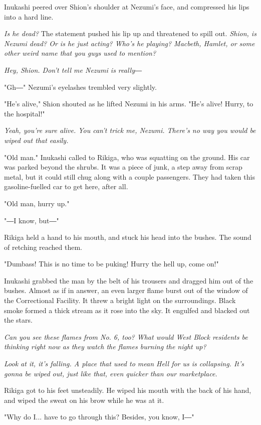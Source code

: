 Inukashi peered over Shion's shoulder at Nezumi's face, and compressed
his lips into a hard line.

\emph{Is he dead?} The statement pushed his lip up and threatened to spill out.
\emph{Shion, is Nezumi dead? Or is he just acting? Who's he playing? Macbeth,
Hamlet, or some other weird name that you guys used to mention?}

\emph{Hey, Shion. Don't tell me Nezumi is really―}

"Gh―" Nezumi's eyelashes trembled very slightly.

"He's alive," Shion shouted as he lifted Nezumi in his arms. "He's
alive! Hurry, to the hospital!"

\emph{Yeah, you're sure alive. You can't trick me, Nezumi. There's no way you
would be wiped out that easily.}

"Old man." Inukashi called to Rikiga, who was squatting on the ground.
His car was parked beyond the shrubs. It was a piece of junk, a step
away from scrap metal, but it could still chug along with a couple
passengers. They had taken this gasoline-fuelled car to get here, after
all.

"Old man, hurry up."

"―I know, but―"

Rikiga held a hand to his mouth, and stuck his head into the bushes. The
sound of retching reached them.

"Dumbass! This is no time to be puking! Hurry the hell up, come on!"

Inukashi grabbed the man by the belt of his trousers and dragged him out
of the bushes. Almost as if in answer, an even larger flame burst out of
the window of the Correctional Facility. It threw a bright light on the
surroundings. Black smoke formed a thick stream as it rose into the sky.
It engulfed and blacked out the stars.

\emph{Can you see these flames from No. 6, too? What would West Block
residents be thinking right now as they watch the flames burning the
night up?}

\emph{Look at it, it's falling. A place that used to mean Hell for us is
collapsing. It's gonna be wiped out, just like that, even quicker than
our marketplace.}

Rikiga got to his feet unsteadily. He wiped his mouth with the back of
his hand, and wiped the sweat on his brow while he was at it.

"Why do I... have to go through this? Besides, you know, I―"

